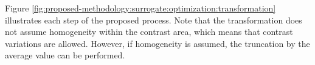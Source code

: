 			Figure \ref{fig:proposed-methodology:surrogate:optimization:transformation} illustrates each step of the proposed process. Note that the transformation does not assume homogeneity within the contrast area, which means that contrast variations are allowed. However, if homogeneity is assumed, the truncation by the average value can be performed.
			
			\begin{figure}[!h]
				\centering
				 \hspace{.05\textwidth}
				 \\
				 \hspace{.05\textwidth}

\end{figure}
